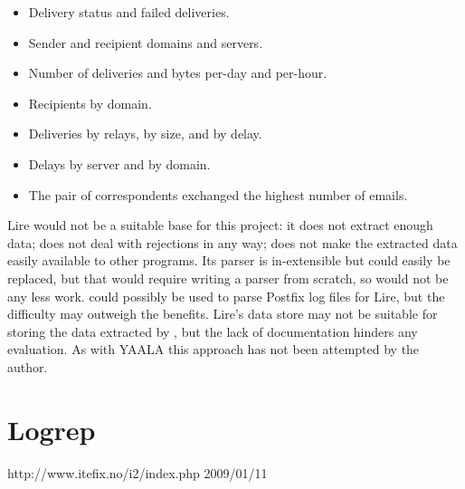 \begin{itemize}

    \item Delivery status and failed deliveries.

    \item Sender and recipient domains and servers.

    \item Number of deliveries and bytes per-day and per-hour.

    \item Recipients by domain.

    \item Deliveries by relays, by size, and by delay.

    \item Delays by server and by domain.

    \item The pair of correspondents exchanged the highest number of
        emails.

\end{itemize}

Lire would not be a suitable base for this project: it does not extract
enough data; does not deal with rejections in any way; does not make the
extracted data easily available to other programs.  Its parser is
in-extensible but could easily be replaced, but that would require writing
a parser from scratch, so would not be any less work.  \parsername{} could
possibly be used to parse Postfix log files for Lire, but the difficulty
may outweigh the benefits.  Lire's data store may not be suitable for
storing the data extracted by \parsername{}, but the lack of documentation
hinders any evaluation.  As with YAALA this approach has not been attempted
by the author.

\section{Logrep}

{http://www.itefix.no/i2/index.php}
{2009/01/11}

